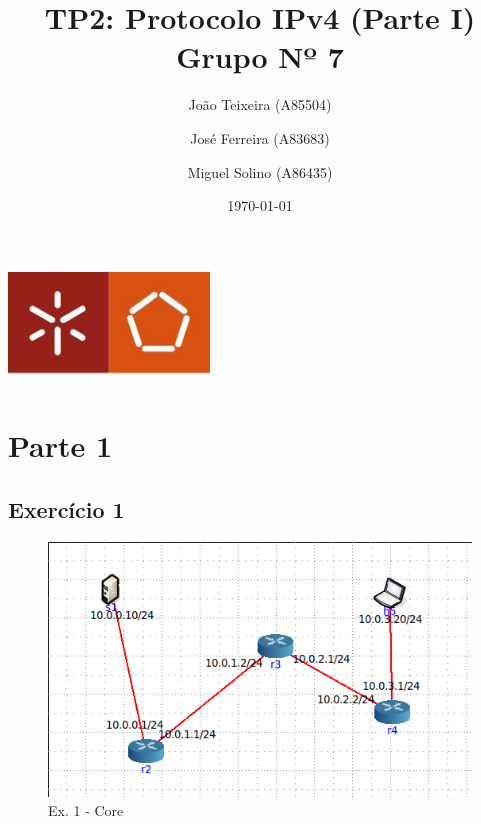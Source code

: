 \documentclass[a4paper]{report}
\begin{document}
\title{TP2:  Protocolo IPv4  (Parte I)\\ 
\large Grupo Nº 7}
\author{João Teixeira (A85504) \and José Ferreira (A83683) \and Miguel Solino (A86435)}

\date{\today}

\begin{center}
    \begin{minipage}{0.75\linewidth}
        \centering
        \includegraphics[width=0.4\textwidth]{images/eng.jpeg}\par\vspace{1cm}
        \vspace{1cm}
        \href{https://www.uminho.pt/PT}
        {\color{black}{\scshape\LARGE Universidade do Minho}} \par
        \vspace{1cm}
        \href{https://www.di.uminho.pt/}
        {\color{black}{\scshape\Large Departamento de Informática}} \par
        \maketitle
    \end{minipage}
\end{center}

\tableofcontents

\pagebreak
\chapter{Parte 1}
\section{Exercício 1}

\begin{figure}[H]
    \centering 
    \includegraphics[width=\textwidth]{images/coreEx1.png}  
    \caption{Ex. 1 - Core}
    \label{fig:coreEx1}
\end{figure}
\end{document}
